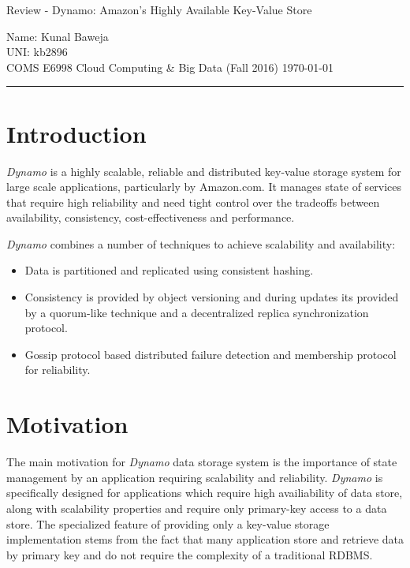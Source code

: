 \documentclass[12pt, a4paper]{article}
\def\name{Kunal Baweja}
\def\uni{kb2896}
\def\assignment{Review - Dynamo: Amazon's Highly Available Key-Value Store}
\def\subject{COMS E6998 Cloud Computing \& Big Data (Fall 2016)}
\begin{document}
\begin{center}
    {\large \assignment}
    \vspace{0.1em}
\end{center}

Name: {\name}\\
UNI: {\uni}\\
{\subject} \hfill {\today}

\rule{\textwidth}{0.2pt}

\section*{Introduction}
\textit{Dynamo}\cite{DeCandia:2007:DAH:1294261.1294281} is a highly scalable, reliable and distributed key-value storage system for large scale applications, particularly by Amazon.com. It manages state of services that require high reliability and need tight control over the tradeoffs between availability, consistency, cost-effectiveness and performance.\par

\textit{Dynamo}\cite{DeCandia:2007:DAH:1294261.1294281} combines a number of techniques to achieve scalability and availability:
\begin{itemize}
        \setlength\itemsep{0em}
        \item Data is partitioned and replicated using consistent hashing.
        \item Consistency is provided by object versioning and during updates its provided by a quorum-like technique and a decentralized replica synchronization protocol.
        \item Gossip protocol based distributed failure detection and membership protocol for reliability.
\end{itemize}

\section*{Motivation}
The main motivation for \textit{Dynamo}\cite{DeCandia:2007:DAH:1294261.1294281} data storage system is the importance of state management by an application requiring scalability and reliability. \textit{Dynamo}\cite{DeCandia:2007:DAH:1294261.1294281} is specifically designed for applications which require high availiability of data store, along with scalability properties and require only primary-key access to a data store. The specialized feature of providing only a key-value storage implementation stems from the fact that many application store and retrieve data by primary key and do not require the complexity of a traditional RDBMS.\par
\end{document}
